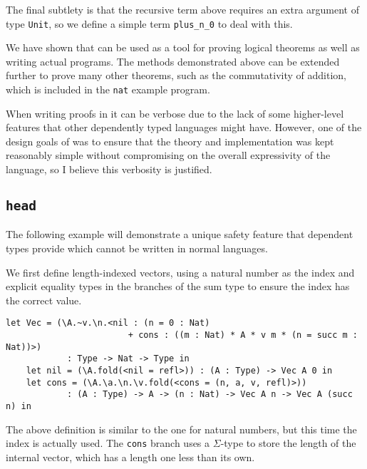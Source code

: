 \documentclass[12pt,a4paper,twoside]{report}
\begin{document}
The final subtlety is that the recursive term above requires an extra argument of type \lstinline{Unit}, so we define a simple term \lstinline{plus_n_0} to deal with this.

We have shown that \pimu{} can be used as a tool for proving logical theorems as well as writing actual programs.
The methods demonstrated above can be extended further to prove many other theorems, such as the commutativity of addition, which is included in the \texttt{nat} example program.

When writing proofs in \pimu{} it can be verbose due to the lack of some higher-level features that other dependently typed languages might have.
However, one of the design goals of \pimu{} was to ensure that the theory and implementation was kept reasonably simple without compromising on the overall expressivity of the language, so I believe this verbosity is justified.

\subsection{\texttt{head}}

The following example will demonstrate a unique safety feature that dependent types provide which cannot be written in normal languages.

We first define length-indexed vectors, using a natural number as the index and explicit equality types in the branches of the sum type to ensure the index has the correct value.
\begin{minipage}{\linewidth}
\begin{lstlisting}[gobble=4]
    let Vec = (\A.~v.\n.<nil : (n = 0 : Nat)
                        + cons : ((m : Nat) * A * v m * (n = succ m : Nat))>)
            : Type -> Nat -> Type in
    let nil = (\A.fold(<nil = refl>)) : (A : Type) -> Vec A 0 in
    let cons = (\A.\a.\n.\v.fold(<cons = (n, a, v, refl)>))
            : (A : Type) -> A -> (n : Nat) -> Vec A n -> Vec A (succ n) in
\end{lstlisting}
\end{minipage}
The above definition is similar to the one for natural numbers, but this time the index is actually used.
The \lstinline{cons} branch uses a \(\Sigma\)-type to store the length of the internal vector, which has a length one less than its own.
\end{document}
